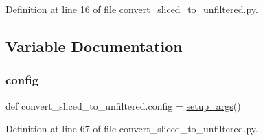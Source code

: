 Definition at line 16 of file convert\+\_\+sliced\+\_\+to\+\_\+unfiltered.\+py.



\subsection{Variable Documentation}
\mbox{\label{namespaceconvert__sliced__to__unfiltered_a53af57b08cb362399bd3263e7a94c646}} 
\subsubsection{\texorpdfstring{config}{config}}
{\footnotesize\ttfamily def convert\+\_\+sliced\+\_\+to\+\_\+unfiltered.\+config = \hyperlink{namespaceconvert__sliced__to__unfiltered_a21ac677a0cb0c5ba6129567460c1ee35}{setup\+\_\+args}()}



Definition at line 67 of file convert\+\_\+sliced\+\_\+to\+\_\+unfiltered.\+py.


